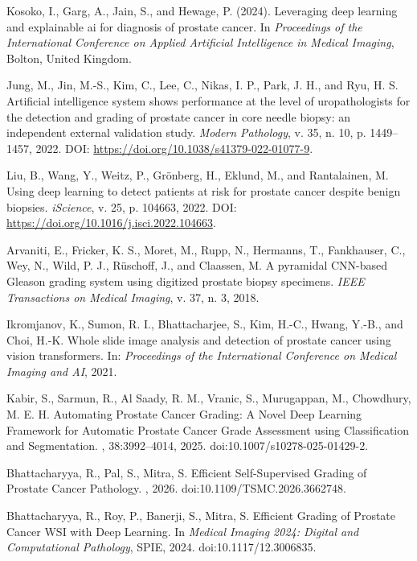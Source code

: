 Kosoko, I., Garg, A., Jain, S., and Hewage, P. (2024).
\newblock Leveraging deep learning and explainable ai for diagnosis of prostate
cancer.
\newblock In {\em Proceedings of the International Conference on Applied
	Artificial Intelligence in Medical Imaging}, Bolton, United Kingdom.

Jung, M., Jin, M.-S., Kim, C., Lee, C., Nikas, I. P., Park, J. H., and Ryu, H. S. 
Artificial intelligence system shows performance at the level of uropathologists for the detection and grading of prostate cancer in core needle biopsy: an independent external validation study. 
\textit{Modern Pathology}, v. 35, n. 10, p. 1449--1457, 2022. 
DOI: \url{https://doi.org/10.1038/s41379-022-01077-9}.

Liu, B., Wang, Y., Weitz, P., Grönberg, H., Eklund, M., and Rantalainen, M.
Using deep learning to detect patients at risk for prostate cancer despite benign biopsies.
\textit{iScience}, v. 25, p. 104663, 2022.
DOI: \url{https://doi.org/10.1016/j.isci.2022.104663}.

Arvaniti, E., Fricker, K. S., Moret, M., Rupp, N., Hermanns, T., Fankhauser, C., Wey, N., Wild, P. J., R{\"u}schoff, J., and Claassen, M.
A pyramidal CNN-based Gleason grading system using digitized prostate biopsy specimens.
\textit{IEEE Transactions on Medical Imaging}, v. 37, n. 3, 2018.

Ikromjanov, K., Sumon, R. I., Bhattacharjee, S., Kim, H.-C., Hwang, Y.-B., and Choi, H.-K.
Whole slide image analysis and detection of prostate cancer using vision transformers.
In: \textit{Proceedings of the International Conference on Medical Imaging and AI}, 2021.

Kabir, S., Sarmun, R., Al Saady, R. M., Vranic, S., Murugappan, M., Chowdhury, M. E. H.  
\newblock Automating Prostate Cancer Grading: A Novel Deep Learning Framework for Automatic Prostate Cancer Grade Assessment using Classification and Segmentation.  
, 38:3992--4014, 2025.  
\newblock doi:10.1007/s10278-025-01429-2.

Bhattacharyya, R., Pal, S., Mitra, S.  
\newblock Efficient Self-Supervised Grading of Prostate Cancer Pathology.  
, 2026.  
\newblock doi:10.1109/TSMC.2026.3662748.

Bhattacharyya, R., Roy, P., Banerji, S., Mitra, S.  
\newblock Efficient Grading of Prostate Cancer WSI with Deep Learning.  
\newblock In {\em Medical Imaging 2024: Digital and Computational Pathology}, SPIE, 2024.  
\newblock doi:10.1117/12.3006835.
